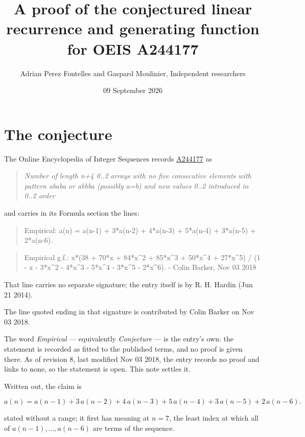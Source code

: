 \documentclass[11pt]{article}
\title{A proof of the conjectured linear recurrence and generating function for OEIS A244177}
\author{Adrian Perez Fontelles and Gaspard Moulinier, Independent researchers}
\date{09 September 2026}
\theoremstyle{definition}
\begin{document}
\maketitle
\section{The conjecture}

The Online Encyclopedia of Integer Sequences records \href{https://oeis.org/A244177}{A244177} as

\begin{quote}\itshape Number of length n+4 0..2 arrays with no five consecutive elements with pattern ababa or abbba (possibly a=b) and new values 0..2 introduced in 0..2 order\end{quote}

and carries in its Formula section the lines:

\begin{quote}\ttfamily Empirical: a(n) = a(n-1) + 3*a(n-2) + 4*a(n-3) + 5*a(n-4) + 3*a(n-5) + 2*a(n-6).\end{quote}

\begin{quote}\ttfamily Empirical g.f.: x*(38 + 70*x + 84*x\textasciicircum{}2 + 85*x\textasciicircum{}3 + 50*x\textasciicircum{}4 + 27*x\textasciicircum{}5) / (1 - x - 3*x\textasciicircum{}2 - 4*x\textasciicircum{}3 - 5*x\textasciicircum{}4 - 3*x\textasciicircum{}5 - 2*x\textasciicircum{}6). - Colin Barker, Nov 03 2018\end{quote}

That line carries no separate signature; the entry itself is by R. H. Hardin (Jun 21 2014).

The line quoted ending in that signature is contributed by Colin Barker on Nov 03 2018.

The word {\itshape Empirical} --- equivalently {\itshape Conjecture} --- is the entry's own: the statement is recorded as fitted to the published terms, and no proof is given there. As of revision 8, last modified Nov 03 2018, the entry records no proof and links to none, so the statement is open. This note settles it.

Written out, the claim is

\[a(n) = a(n-1) + 3\,a(n-2) + 4\,a(n-3) + 5\,a(n-4) + 3\,a(n-5) + 2\,a(n-6).\]

stated without a range; it first has meaning at $n = 7$, the least index at which all of $a(n-1),\dots,a(n-6)$ are terms of the sequence.
\end{document}
